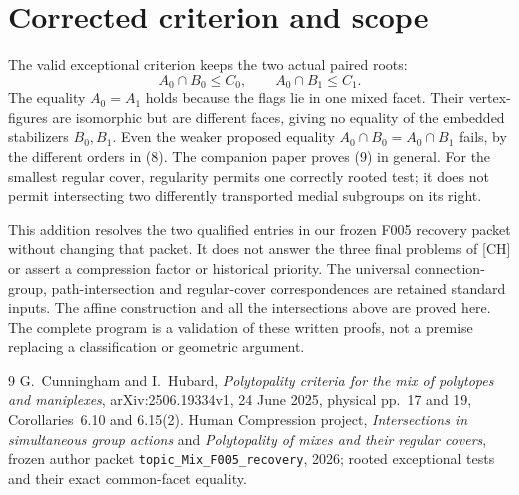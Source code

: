 \documentclass[a4paper,11pt]{article}
\begin{document}
\section{Corrected criterion and scope}
The valid exceptional criterion keeps the two actual paired roots:
\[
 A_0\cap B_0\leq C_0,\qquad A_0\cap B_1\leq C_1.       \tag{9}
\]
The equality $A_0=A_1$ holds because the flags lie in one mixed facet.
Their vertex-figures are isomorphic but are different faces, giving
no equality of the embedded stabilizers $B_0,B_1$.
Even the weaker proposed equality $A_0\cap B_0=A_0\cap B_1$ fails,
by the different orders in (8). The companion paper proves (9) in
general. For the smallest regular cover, regularity permits one
correctly rooted test; it does not permit intersecting two differently
transported medial subgroups on its right.

This addition resolves the two qualified entries in our frozen F005
recovery packet without changing that packet. It does not answer the
three final problems of [CH] or assert a compression factor or
historical priority. The universal connection-group, path-intersection
and regular-cover correspondences are retained standard inputs. The
affine construction and all the intersections above are proved here.
The complete program is a validation of these written proofs, not a
premise replacing a classification or geometric argument.

\begin{thebibliography}{9}
 G.~Cunningham and I.~Hubard, \emph{Polytopality criteria for the
mix of polytopes and maniplexes}, arXiv:2506.19334v1, 24 June 2025,
physical pp.~17 and 19, Corollaries~6.10 and 6.15(2).
 Human Compression project, \emph{Intersections in simultaneous group
actions} and \emph{Polytopality of mixes and their regular covers},
frozen author packet \texttt{topic\_Mix\_F005\_recovery}, 2026;
rooted exceptional tests and their exact common-facet equality.
\end{thebibliography}
\end{document}
